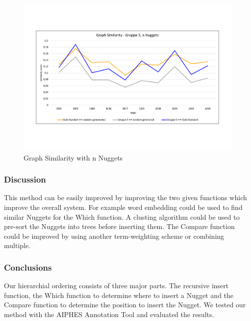 \begin{figure}[H]
	\centering
	\includegraphics[trim= 0 120 0 120,width=\textwidth]{img/sim_v2.pdf}
	\caption{Graph Similarity with n Nuggets}
	\label{fig:spc}
\end{figure}



\subsubsection{Discussion}




This method can be easily improved by improving the two given functions which improve the overall system. For example word embedding could be used to find similar Nuggets for the Which function. A clusting algorithm could be used to pre-sort the Nuggets into trees before inserting them. The Compare function could be improved by using another term-weighting scheme or combining multiple.



\subsubsection{Conclusions}

Our hierarchial ordering consists of three major parts. The recursive insert function, the Which function to determine where to insert a Nugget and the Compare function to determine the position to insert the Nugget. We tested our method with the AIPHES Annotation Tool and evaluated the results.


